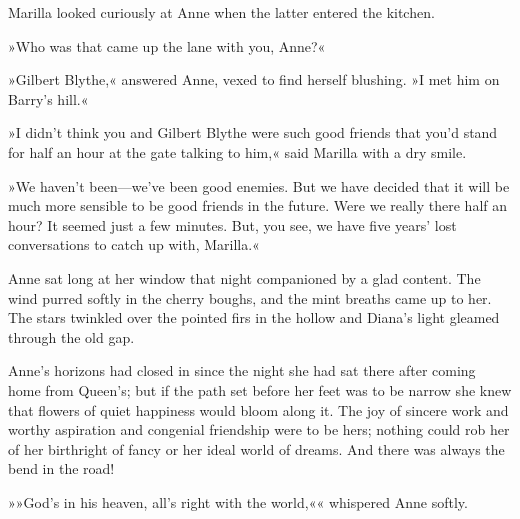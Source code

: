 Marilla looked curiously at Anne when the latter entered the kitchen.

»Who was that came up the lane with you, Anne?«

»Gilbert Blythe,« answered Anne, vexed to find herself blushing. »I met him on Barry's hill.«

»I didn't think you and Gilbert Blythe were such good friends that you'd stand for half an hour at the gate talking to him,« said Marilla with a dry smile.

»We haven't been—we've been good enemies. But we have decided that it will be much more sensible to be good friends in the future. Were we really there half an hour? It seemed just a few minutes. But, you see, we have five years' lost conversations to catch up with, Marilla.«

Anne sat long at her window that night companioned by a glad content. The wind purred softly in the cherry boughs, and the mint breaths came up to her. The stars twinkled over the pointed firs in the hollow and Diana's light gleamed through the old gap.

Anne's horizons had closed in since the night she had sat there after coming home from Queen's; but if the path set before her feet was to be narrow she knew that flowers of quiet happiness would bloom along it. The joy of sincere work and worthy aspiration and congenial friendship were to be hers; nothing could rob her of her birthright of fancy or her ideal world of dreams. And there was always the bend in the road!

»»God's in his heaven, all's right with the world,«« whispered Anne softly.
